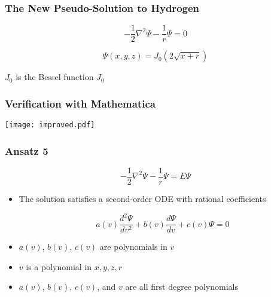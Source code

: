 \documentclass[11pt]{beamer}
\begin{document}
\begin{frame}
\frametitle{The New Pseudo-Solution to Hydrogen}

\[ - \frac{1}{2} \nabla^2 \Psi - \frac{1}{r} \Psi = 0 \]

\[ \Psi(x,y,z) = J_0(2\sqrt{x+r}) \]

\vskip 0.5in

$J_0$ is the Bessel function $J_0$

\end{frame}

\begin{frame}
\frametitle{Verification with Mathematica}
\texttt{[image: improved.pdf]}
\end{frame}

\begin{frame}
\frametitle{Ansatz 5}

\[ - \frac{1}{2} \nabla^2 \Psi - \frac{1}{r} \Psi = E \Psi \]

\vskip 12pt

\begin{itemize}
\item The solution satisfies a second-order ODE with rational coefficients

\[ a(v) \frac{d^2 \Psi}{dv^2} + b(v) \frac{d \Psi}{dv} + c(v) \Psi = 0 \]

\item $a(v)$, $b(v)$, $c(v)$ are polynomials in $v$

\item $v$ is a polynomial in $x,y,z,r$

\item $a(v)$, $b(v)$, $c(v)$, and $v$ are all first degree polynomials
\end{itemize}
\end{frame}
\end{document}
